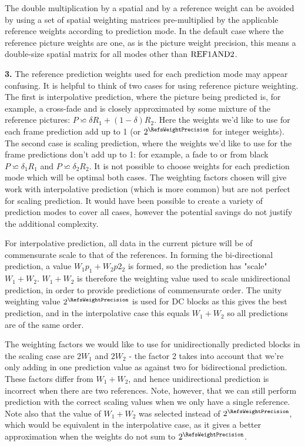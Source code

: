 \begin{informative}
The double multiplication by a spatial and by a reference weight can be 
avoided by using a set of spatial weighting matrices
pre-multiplied by the applicable reference weights according to 
prediction mode. In the default case where the reference
picture weights are one, as is the picture weight precision, 
this means a double-size spatial matrix for all modes other than
$\text{REF1AND2}$.

{\bf 3.} The reference prediction weights used for each prediction mode may appear confusing. It is helpful
to think of two cases for using reference picture weighting. The first is interpolative 
prediction, where the picture being predicted is, for example, a cross-fade and is
closely approximated by some mixture of the reference pictures:
 $P\backsimeq\delta R_1+(1-\delta)R_2$. Here the weights we'd like to
use for each frame prediction add up to 1 (or $2^\RefsWeightPrecision$ for integer weights). 
The second case is scaling prediction, where 
the weights we'd like to use for the frame predictions don't add up to 1: for example,
a fade to or from black
$P\backsimeq\delta_1 R_1$ and $P\backsimeq\delta_2 R_2$. It is not possible to choose 
weights for each prediction mode which will be optimal both cases. The weighting
factors chosen will give work with interpolative prediction (which is more common) 
but are not perfect for scaling prediction. It would have been possible to create a variety of
prediction modes to cover all cases, however the potential savings do not justify the
additional complexity.

For interpolative prediction, all data in the current picture will be of commensurate scale to
that of the references. In forming the bi-directional prediction, a value $W_1 p_1 + W_2 p2_2$ is 
formed, so the prediction has "scale" $W_1+W_2$. $W_1+W_2$ is 
therefore the weighting value used to scale unidirectional prediction, in order to provide
predictions of commensurate order. The unity weighting value $2^\RefsWeightPrecision$ is used
for DC blocks as this gives the best prediction, and in the interpolative case this equals $W_1+W_2$
so all predictions are of the same order.

The weighting factors we would like to use for unidirectionally predicted blocks in the scaling case
are $2W_1$ and $2W_2$ - the factor 2 takes into account that we're only adding in one prediction
value as against two for bidirectional prediction. These factors differ from $W_1+W_2$, and hence
unidirectional prediction is incorrect when there are two references. Note, however, that we can
still perform prediction with the correct scaling values when we only have a single reference. Note
also that the value of $W_1+W_2$ was selected instead of $2^\RefsWeightPrecision$, which
would be equivalent in the interpolative case, as it gives a better approximation when the
weights do not sum to $2^\RefsWeightPrecision$.
\end{informative}

